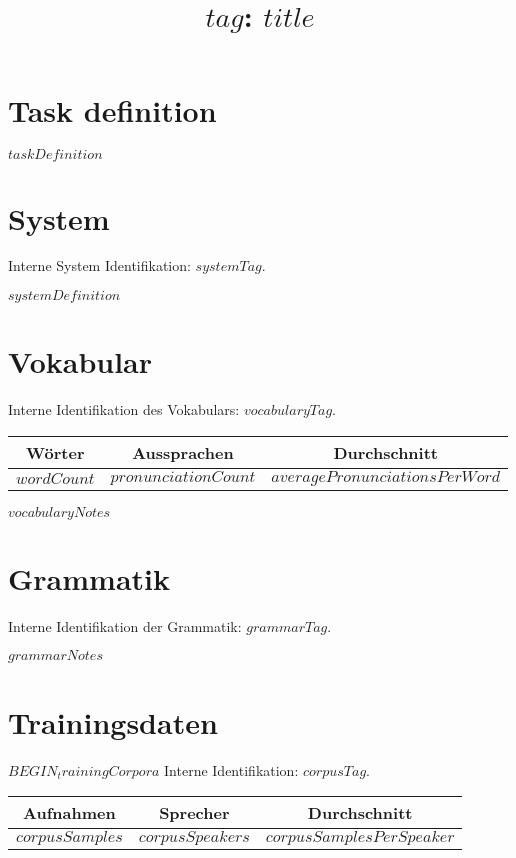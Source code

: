 \documentclass[a4paper,10pt,bibtotoc]{scrartcl}
\title{$tag$: $title$}
\begin{document}

\maketitle


\section{Task definition}
$taskDefinition$

\section{System}
\label{sec:System}

Interne System Identifikation: $systemTag$.

$systemDefinition$

\section{Vokabular}

Interne Identifikation des Vokabulars: $vocabularyTag$.

\begin{tabular}{|c|c|c|}
\hline
{\bf Wörter} & {\bf Aussprachen} & {\bf Durchschnitt} \\
\hline
$wordCount$ & $pronunciationCount$ & $averagePronunciationsPerWord$ \\
\hline
\end{tabular}

$vocabularyNotes$

\section{Grammatik}

Interne Identifikation der Grammatik: $grammarTag$.

$grammarNotes$

\section{Trainingsdaten}

$BEGIN_trainingCorpora$
Interne Identifikation: $corpusTag$.

\begin{tabular}{|c|c|c|}
\hline
{\bf Aufnahmen} & {\bf Sprecher} & {\bf Durchschnitt} \\
\hline
$corpusSamples$ & $corpusSpeakers$ & $corpusSamplesPerSpeaker$ \\
\hline
\end{tabular}
\end{document}
